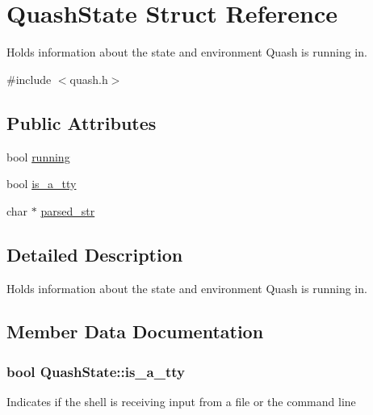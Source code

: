 \hypertarget{structQuashState}{}\section{Quash\+State Struct Reference}
\label{structQuashState}


Holds information about the state and environment Quash is running in.  




{\ttfamily \#include $<$quash.\+h$>$}

\subsection*{Public Attributes}
\begin{DoxyCompactItemize}
\item 
bool \hyperlink{structQuashState_a7db3a718696ee9d0c7f8b649ccb88bb4}{running}
\item 
bool \hyperlink{structQuashState_a6d92242ecd91c33779ea2deae58956bf}{is\+\_\+a\+\_\+tty}
\item 
char $\ast$ \hyperlink{structQuashState_a69d0ad3cb3bf44a92459020d98814f7e}{parsed\+\_\+str}
\end{DoxyCompactItemize}


\subsection{Detailed Description}
Holds information about the state and environment Quash is running in. 

\subsection{Member Data Documentation}
\subsubsection[{\texorpdfstring{is\+\_\+a\+\_\+tty}{is_a_tty}}]{\setlength{\rightskip}{0pt plus 5cm}bool Quash\+State\+::is\+\_\+a\+\_\+tty}\hypertarget{structQuashState_a6d92242ecd91c33779ea2deae58956bf}{}\label{structQuashState_a6d92242ecd91c33779ea2deae58956bf}
Indicates if the shell is receiving input from a file or the command line 
